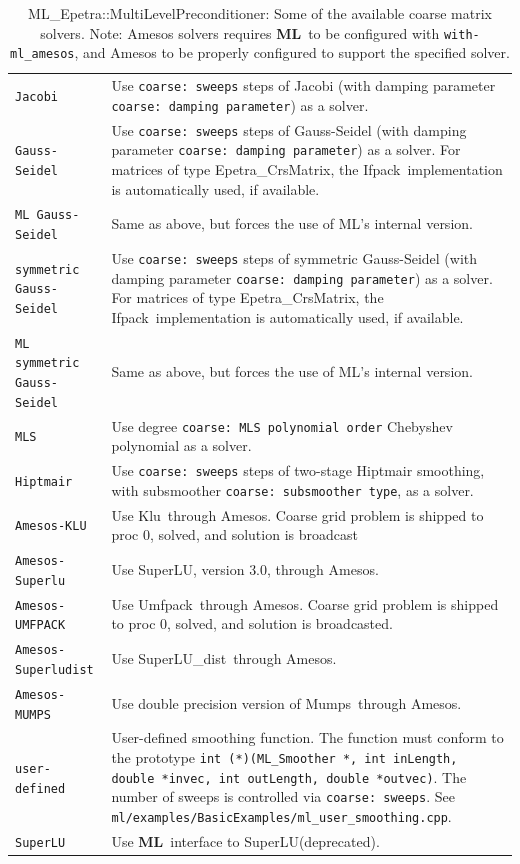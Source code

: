 \documentclass{article}[11pt]
\newcommand{\ML}     {{\bf ML}}
\newcommand{\amesos}  {{\sc Amesos}}
\newcommand{\umfpack}  {{\sc Umfpack}}
\newcommand{\superlu}  {{\sc SuperLU}}
\newcommand{\superludist}  {{\sc SuperLU\_dist}}
\newcommand{\mumps}  {{\sc Mumps}}
\newcommand{\klu}  {{\sc Klu}}
\newcommand{\ifpack}  {{\sc Ifpack}}
\begin{document}
\begin{table}[tbh]
\begin{center}
\begin{tabular}{ | p{4.5cm} | p{10cm} | }
\hline
\verb!Jacobi! & Use {\tt coarse: sweeps} steps of Jacobi (with damping
parameter {\tt coarse: damping parameter}) as a solver. \\
\verb!Gauss-Seidel! & Use  {\tt coarse: sweeps} steps of Gauss-Seidel (with
damping parameter {\tt coarse: damping parameter}) as a solver.
For matrices of type Epetra\_CrsMatrix, the \ifpack\
implementation is automatically used, if available. \\
\verb!ML Gauss-Seidel! & Same as above, but forces the use of ML's
internal version.\\
\verb!symmetric Gauss-Seidel! & Use  {\tt coarse: sweeps} steps of symmetric
Gauss-Seidel (with damping parameter {\tt coarse: damping parameter}) as a
 solver.  For matrices of type Epetra\_CrsMatrix, the \ifpack\
implementation is automatically used, if available. \\
\verb!ML symmetric Gauss-Seidel! & Same as above, but forces the use of ML's
internal version.\\
\verb!MLS! & Use degree {\tt coarse: MLS polynomial order} Chebyshev polynomial
             as a solver. \\
\verb!Hiptmair! & Use {\tt coarse: sweeps} steps of two-stage Hiptmair
             smoothing, with subsmoother {\tt coarse: subsmoother type},
             as a solver. \\
\verb!Amesos-KLU! & Use \klu\ through \amesos. Coarse grid problem is shipped to
 proc 0, solved, and solution is broadcast \\
\verb!Amesos-Superlu! & Use \superlu, version $3.0$, through \amesos. \\
\verb!Amesos-UMFPACK! & Use \umfpack\ through \amesos. Coarse grid problem is shipped to
 proc 0, solved, and solution is broadcasted. \\
\verb!Amesos-Superludist! & Use \superludist\ through \amesos. \\
\verb!Amesos-MUMPS! & Use double precision version of \mumps~through
\amesos. \\
\verb!user-defined! & User-defined smoothing function.  The function must conform to
the prototype {\tt int (*)(ML\_Smoother *, int inLength, double *invec, int outLength,
 double *outvec)}. The number of sweeps is controlled via {\tt coarse: sweeps}. See
{\tt ml/examples/BasicExamples/ml\_user\_smoothing.cpp}.\\
\verb!SuperLU! & Use \ML\ interface to \superlu (deprecated). \\
\hline
\end{tabular}
\caption{ML\_Epetra::MultiLevelPreconditioner: Some of the available coarse
matrix solvers. Note: Amesos solvers requires 
  \ML\ to be configured with {\tt with-ml\_amesos}, and Amesos to be
  properly configured to support the specified solver.}
\label{tab:ml:coarse}
\end{center}
\end{table}
%
\end{document}
